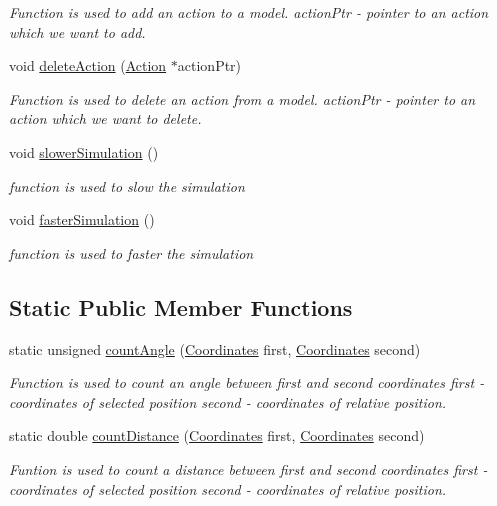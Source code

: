 \begin{DoxyCompactItemize}
\begin{DoxyCompactList}\small\item\em Function is used to add an action to a model.  action\+Ptr -\/ pointer to an action which we want to add. \end{DoxyCompactList}\item 
void \hyperlink{class_model_a9304a9af75efde3ec6184d34ac24c86f}{delete\+Action} (\hyperlink{class_action}{Action} $\ast$action\+Ptr)
\begin{DoxyCompactList}\small\item\em Function is used to delete an action from a model.  action\+Ptr -\/ pointer to an action which we want to delete. \end{DoxyCompactList}\item 
void \hyperlink{class_model_a339945890a1fe792078235da65d5caa0}{slower\+Simulation} ()
\begin{DoxyCompactList}\small\item\em function is used to slow the simulation \end{DoxyCompactList}\item 
void \hyperlink{class_model_a4542cf27ca6b129d71b5989e327766e8}{faster\+Simulation} ()
\begin{DoxyCompactList}\small\item\em function is used to faster the simulation \end{DoxyCompactList}\end{DoxyCompactItemize}
\subsection*{Static Public Member Functions}
\begin{DoxyCompactItemize}
\item 
static unsigned \hyperlink{class_model_aa5648d070ba25c9668f598af21e32b48}{count\+Angle} (\hyperlink{struct_coordinates}{Coordinates} first, \hyperlink{struct_coordinates}{Coordinates} second)
\begin{DoxyCompactList}\small\item\em Function is used to count an angle between first and second coordinates  first -\/ coordinates of selected position  second -\/ coordinates of relative position. \end{DoxyCompactList}\item 
static double \hyperlink{class_model_add64a8dda26f0bf29efe9d633a1e3959}{count\+Distance} (\hyperlink{struct_coordinates}{Coordinates} first, \hyperlink{struct_coordinates}{Coordinates} second)
\begin{DoxyCompactList}\small\item\em Funtion is used to count a distance between first and second coordinates  first -\/ coordinates of selected position  second -\/ coordinates of relative position. \end{DoxyCompactList}\end{DoxyCompactItemize}


